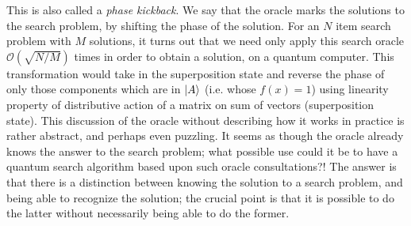 This is also called a \textit{phase kickback}. We say that the oracle marks the solutions to the search problem, by shifting the phase of the solution. For an $N$ item search problem with $M$ solutions, it turns out that we need only apply this search oracle $\mathcal{O}(\sqrt{N/M})$ times in order to obtain a solution, on a quantum computer. This transformation would take in the superposition state and reverse the phase of only those components which are in $\ket{A}$ (i.e. whose $f(x)=1$) using linearity property of distributive action of a matrix on sum of vectors (superposition state). This discussion of the oracle without describing how it works in practice is rather abstract, and perhaps even puzzling. It seems as though the oracle already knows the answer to the search problem; what possible use could it be to have a quantum search algorithm based upon such oracle consultations?! The answer is that there is a distinction between knowing the solution to a search problem, and being able to recognize the solution; the crucial point is that it is possible to do the latter without necessarily being able to do the former. 


